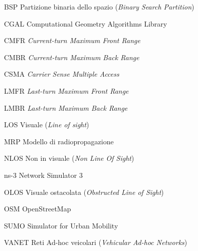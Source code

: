 \begin{abbreviations}

\item[BSP] Partizione binaria dello spazio (\textit{Binary Search Partition})
\item[CGAL] Computational Geometry Algorithms Library
\item[CMFR] \textit{Current-turn Maximum Front Range}
\item[CMBR] \textit{Current-turn Maximum Back Range}
\item[CSMA] \textit{Carrier Sense Multiple Access}
\item[LMFR] \textit{Last-turn Maximum Front Range}
\item[LMBR] \textit{Last-turn Maximum Back Range}
\item[LOS] Visuale (\textit{Line of sight})
\item[MRP] Modello di radiopropagazione
\item[NLOS] Non in visuale (\textit{Non Line Of Sight})
\item[ns-3] Network Simulator 3
\item[OLOS] Visuale ostacolata (\textit{Obstructed Line of Sight})
\item[OSM] OpenStreetMap
\item[SUMO] Simulator for Urban Mobility
\item[VANET] Reti Ad-hoc veicolari (\textit{Vehicular Ad-hoc Networks})

\end{abbreviations}
